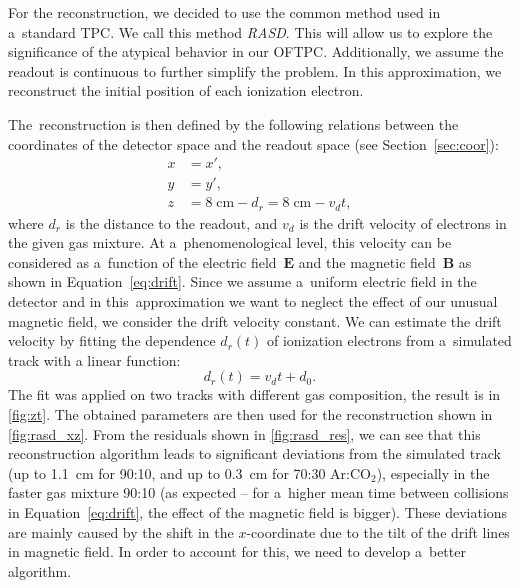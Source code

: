 		For the reconstruction, we decided to use the common method used in a~standard \ac{TPC}. We call this method \textit{\acf{RASD}}. This will allow us to explore the significance of the atypical behavior in our \ac{OFTPC}. Additionally, we assume the readout is continuous to further simplify the problem. In this approximation, we reconstruct the initial position of each ionization electron.
		
		The~reconstruction is then defined by the following relations between the coordinates of the detector space and the readout space (see Section~\ref{sec:coor}):
			\begin{align}
				x &= x',\\
				y &= y',\\
				z &= 8\;\text{cm} - d_r = 8\;\text{cm} - v_d t,
			\end{align}
		where $d_r$ is the distance to the readout, and $v_d$ is the drift velocity of electrons in the given gas mixture. At a~phenomenological level, this velocity can be considered as a~function of the electric field~$\bm{E}$ and the magnetic field~$\bm{B}$ as shown in Equation~\ref{eq:drift}. Since we assume a~uniform electric field in the detector and in this~approximation we want to neglect the effect of our unusual magnetic field, we consider the drift velocity constant. We can estimate the drift velocity by fitting the dependence $d_r(t)$ of ionization electrons from a~simulated track with a linear function:
			\begin{equation}
				d_r(t) = v_d t + d_0.
			\end{equation}
		The fit was applied on two tracks with different gas composition, the result is in \cref{fig:zt}. The obtained parameters are then used for the reconstruction shown in \cref{fig:rasd_xz}. From the residuals shown in \cref{fig:rasd_res}, we can see that this reconstruction algorithm leads to significant deviations from the simulated track (up to 1.1~cm for 90:10, and up to 0.3~cm for 70:30 Ar:CO$_2$), especially in the faster gas mixture 90:10 (as expected -- for a~higher mean time between collisions in Equation~\ref{eq:drift}, the effect of the magnetic field is bigger). These deviations are mainly caused by the shift in the $x$\nobreakdash-coordinate due to the tilt of the drift lines in magnetic field. In order to account for this, we need to develop a~better algorithm.
		
